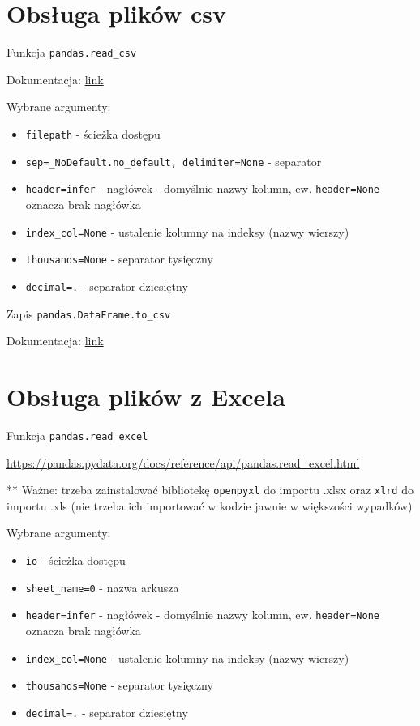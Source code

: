 \documentclass[
  polish,
  letterpaper,
  DIV=11,
  numbers=noendperiod]{scrreprt}
\providecommand{\tightlist}{%
  \setlength{\itemsep}{0pt}\setlength{\parskip}{0pt}}
\begin{document}
\section{Obsługa plików csv}\label{obsux142uga-plikuxf3w-csv}

Funkcja \texttt{pandas.read\_csv}

Dokumentacja:
\href{https://pandas.pydata.org/pandas-docs/stable/reference/api/pandas.read_csv.html}{link}

Wybrane argumenty:

\begin{itemize}
\tightlist
\item
  \texttt{filepath} - ścieżka dostępu
\item
  \texttt{sep=\_NoDefault.no\_default,\ delimiter=None} - separator
\item
  \texttt{header=\textquotesingle{}infer\textquotesingle{}} - nagłówek -
  domyślnie nazwy kolumn, ew. \texttt{header=None} oznacza brak nagłówka
\item
  \texttt{index\_col=None} - ustalenie kolumny na indeksy (nazwy
  wierszy)
\item
  \texttt{thousands=None} - separator tysięczny
\item
  \texttt{decimal=\textquotesingle{}.\textquotesingle{}} - separator
  dziesiętny
\end{itemize}

Zapis \texttt{pandas.DataFrame.to\_csv}

Dokumentacja:
\href{https://pandas.pydata.org/pandas-docs/stable/reference/api/pandas.DataFrame.to_csv.html}{link}

\section{Obsługa plików z Excela}\label{obsux142uga-plikuxf3w-z-excela}

Funkcja \texttt{pandas.read\_excel}

\url{https://pandas.pydata.org/docs/reference/api/pandas.read_excel.html}

** Ważne: trzeba zainstalować bibliotekę \texttt{openpyxl} do importu
.xlsx oraz \texttt{xlrd} do importu .xls (nie trzeba ich importować w
kodzie jawnie w większości wypadków)

Wybrane argumenty:

\begin{itemize}
\tightlist
\item
  \texttt{io} - ścieżka dostępu
\item
  \texttt{sheet\_name=0} - nazwa arkusza
\item
  \texttt{header=\textquotesingle{}infer\textquotesingle{}} - nagłówek -
  domyślnie nazwy kolumn, ew. \texttt{header=None} oznacza brak nagłówka
\item
  \texttt{index\_col=None} - ustalenie kolumny na indeksy (nazwy
  wierszy)
\item
  \texttt{thousands=None} - separator tysięczny
\item
  \texttt{decimal=\textquotesingle{}.\textquotesingle{}} - separator
  dziesiętny
\end{itemize}
\end{document}
